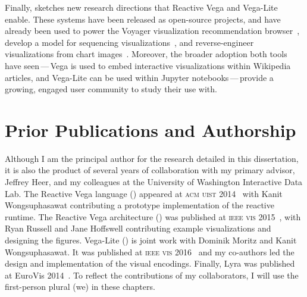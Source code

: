 Finally,  sketches new research directions that Reactive
Vega and Vega-Lite enable. These systems have been released as open-source
projects, and have already been used to power the Voyager visualization
recommendation browser~\cite{voyager,voyager2,compassql}, develop a model for
sequencing visualizations~\cite{kim:graphscape}, and reverse-engineer
visualizations from chart images~\cite{poco:reverse}. Moreover, the broader
adoption both tools have seen\,---\,Vega is used to embed interactive
visualizations within Wikipedia articles, and Vega-Lite can be used within
Jupyter notebooks\,---\,provide a growing, engaged user community to study their
use with.

\vspace{-10pt}

\section{Prior Publications and Authorship}

\vspace{-10pt}

Although I am the principal author for the research detailed in this
dissertation, it is also the product of several years of collaboration with my
primary advisor, Jeffrey Heer, and my colleagues at the University of Washington
Interactive Data Lab. The Reactive Vega language () appeared
at \textsc{acm uist} 2014~\cite{satyanarayan:declarative} with Kanit
Wongsuphasawat contributing a prototype implementation of the reactive runtime.
The Reactive Vega architecture () was published at
\textsc{ieee vis} 2015~\cite{reactive-vega-arch}, with Ryan Russell and Jane
Hoffswell contributing example visualizations and designing the figures.
Vega-Lite () is joint work with Dominik Moritz and Kanit
Wongsuphasawat. It was published at \textsc{ieee vis} 2016~\cite{vega-lite} and
my co-authors led the design and implementation of the visual encodings.
Finally, Lyra was published at EuroVis 2014~\cite{lyra}. To reflect the
contributions of my collaborators, I will use the first-person plural (we) in
these chapters.